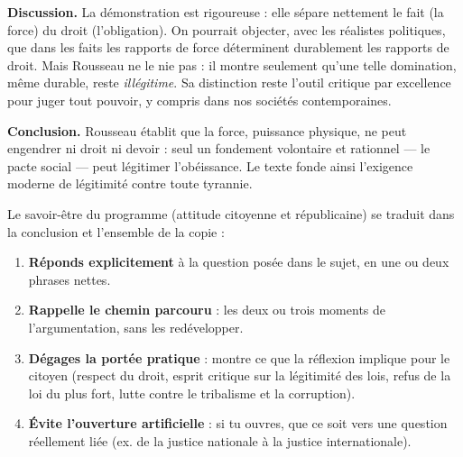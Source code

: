 \documentclass[11pt]{article}
\begin{document}
\begin{exoresolu}
\textbf{Discussion.} La démonstration est rigoureuse : elle sépare nettement le fait (la force) du droit (l'obligation). On pourrait objecter, avec les réalistes politiques, que dans les faits les rapports de force déterminent durablement les rapports de droit. Mais Rousseau ne le nie pas : il montre seulement qu'une telle domination, même durable, reste \emph{illégitime}. Sa distinction reste l'outil critique par excellence pour juger tout pouvoir, y compris dans nos sociétés contemporaines.

\textbf{Conclusion.} Rousseau établit que la force, puissance physique, ne peut engendrer ni droit ni devoir : seul un fondement volontaire et rationnel — le pacte social — peut légitimer l'obéissance. Le texte fonde ainsi l'exigence moderne de légitimité contre toute tyrannie.
\end{exoresolu}

\begin{methode}
Le savoir-être du programme (attitude citoyenne et républicaine) se traduit dans la conclusion et l'ensemble de la copie :
\begin{enumerate}
\item \textbf{Réponds explicitement} à la question posée dans le sujet, en une ou deux phrases nettes.
\item \textbf{Rappelle le chemin parcouru} : les deux ou trois moments de l'argumentation, sans les redévelopper.
\item \textbf{Dégages la portée pratique} : montre ce que la réflexion implique pour le citoyen (respect du droit, esprit critique sur la légitimité des lois, refus de la loi du plus fort, lutte contre le tribalisme et la corruption).
\item \textbf{Évite l'ouverture artificielle} : si tu ouvres, que ce soit vers une question réellement liée (ex. de la justice nationale à la justice internationale).
\end{enumerate}
\end{methode}
\end{document}
